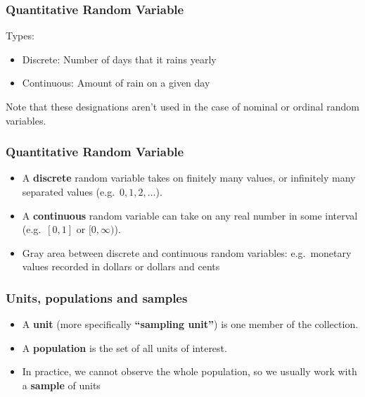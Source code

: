 \begin{frame}
\frametitle{ Quantitative Random Variable }
Types:
\begin{itemize}
\item Discrete: Number of days that it rains yearly 
\item Continuous:  Amount of rain on a given day 
\end{itemize}
Note that these designations aren't used in the case of nominal or
ordinal random variables.
\end{frame}

\begin{frame}
\frametitle{ Quantitative Random Variable }

\begin{itemize}
\item A {\bf discrete} random variable takes on finitely many values, or
infinitely many separated values (e.g.\ $0,1,2,\ldots$).

\item A {\bf continuous} random variable can take on any real number in some
interval (e.g.\ $[0,1]$ or $[0,\infty)$).  

\item Gray area between discrete and continuous random variables:
e.g.\ monetary values recorded in dollars or dollars and cents
\end{itemize}
\end{frame}

\begin{frame}
\frametitle{Units, populations and samples}

\begin{itemize}
\item A {\bf unit} (more specifically {\bf ``sampling unit''}) is one member
of the collection.
\item A {\bf population} is the set of all units of interest. 
\item In practice, we cannot observe the whole population, so we usually
work with a {\bf sample} of units
\end{itemize}
\end{frame}

